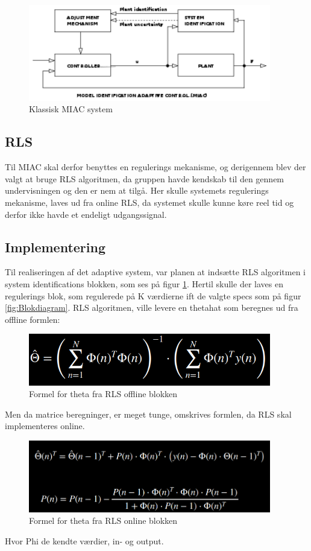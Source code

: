 \begin{figure}[H]
	\centering
	\includegraphics[width = 300pt]{figur/MIAC}
	\caption{Klassisk MIAC system}
	\label{fig:MIAC}
\end{figure}

\subsection{RLS}
Til MIAC skal derfor benyttes en regulerings mekanisme, og derigennem blev der valgt at bruge RLS algoritmen, da gruppen havde kendskab til den gennem undervisningen og den er nem at tilgå. Her skulle systemets regulerings mekanisme, laves ud fra online RLS, da systemet skulle kunne køre reel tid og derfor ikke havde et endeligt udgangssignal. 

\subsection{Implementering}
Til realiseringen af det adaptive system, var planen at indsætte RLS algoritmen i system identifications blokken, som ses på figur \ref{fig:MIAC}. Hertil skulle der laves en regulerings blok, som regulerede på K værdierne ift de valgte specs som på figur \ref{fig:Blokdiagram}.
RLS algoritmen, ville levere en thetahat som beregnes ud fra offline formlen:

\begin{figure}[H]
	\centering
	\includegraphics[width = 300pt]{figur/theta_formel}
	\caption{Formel for theta fra RLS offline blokken}
	\label{fig:theta_formel}
\end{figure}
Men da matrice beregninger, er meget tunge, omskrives formlen, da RLS skal implementeres online. 
 \begin{figure}[H]
	\centering
	\includegraphics[width = 300pt]{figur/RLS_formel}
	\caption{Formel for theta fra RLS online blokken}
	\label{fig:RLS_formel}
\end{figure}
Hvor Phi de kendte værdier, in- og output. 

